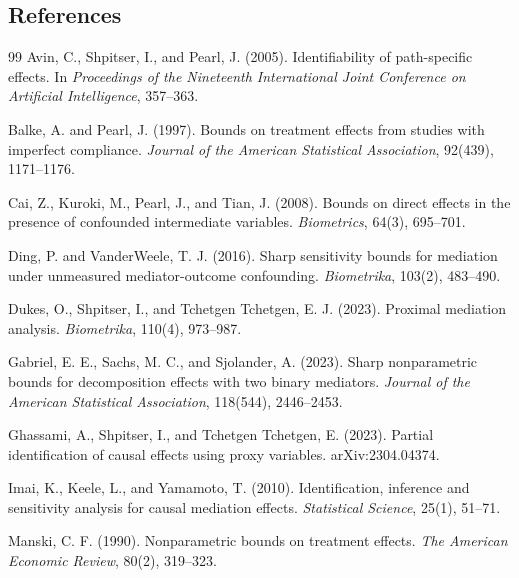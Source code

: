 \documentclass[11pt]{article}
\theoremstyle{definition}
\theoremstyle{plain}
\theoremstyle{remark}
\begin{document}
\subsection*{References}
\begin{thebibliography}{99}
Avin, C., Shpitser, I., and Pearl, J. (2005).
Identifiability of path-specific effects.
In \emph{Proceedings of the Nineteenth International Joint Conference on Artificial Intelligence},
357--363.

Balke, A. and Pearl, J. (1997).
Bounds on treatment effects from studies with imperfect compliance.
\emph{Journal of the American Statistical Association}, 92(439), 1171--1176.

Cai, Z., Kuroki, M., Pearl, J., and Tian, J. (2008).
Bounds on direct effects in the presence of confounded intermediate variables.
\emph{Biometrics}, 64(3), 695--701.

Ding, P. and VanderWeele, T. J. (2016).
Sharp sensitivity bounds for mediation under unmeasured mediator-outcome
confounding.
\emph{Biometrika}, 103(2), 483--490.

Dukes, O., Shpitser, I., and Tchetgen Tchetgen, E. J. (2023).
Proximal mediation analysis.
\emph{Biometrika}, 110(4), 973--987.

Gabriel, E. E., Sachs, M. C., and Sjolander, A. (2023).
Sharp nonparametric bounds for decomposition effects with two binary mediators.
\emph{Journal of the American Statistical Association}, 118(544), 2446--2453.

Ghassami, A., Shpitser, I., and Tchetgen Tchetgen, E. (2023).
Partial identification of causal effects using proxy variables.
arXiv:2304.04374.

Imai, K., Keele, L., and Yamamoto, T. (2010).
Identification, inference and sensitivity analysis for causal mediation effects.
\emph{Statistical Science}, 25(1), 51--71.

Manski, C. F. (1990).
Nonparametric bounds on treatment effects.
\emph{The American Economic Review}, 80(2), 319--323.


\end{thebibliography}
\end{document}
